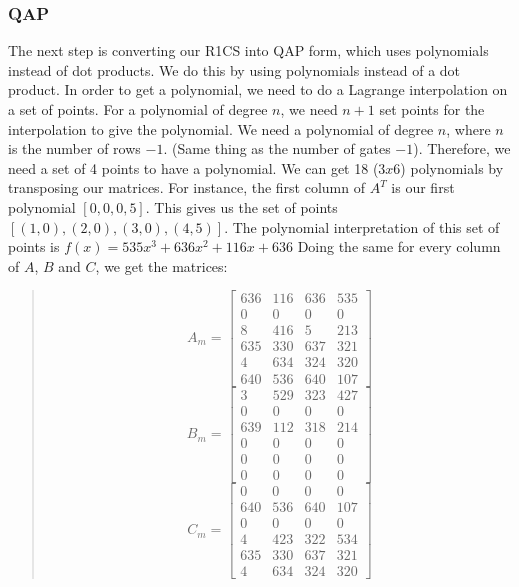 \subsubsection{QAP}
The next step is converting our R1CS into QAP form, which uses polynomials instead of dot products.
We do this by using polynomials instead of a dot product.
In order to get a polynomial, we need to do a Lagrange interpolation on a set of points.
For a polynomial of degree $n$, we need $n+1$ set points for the interpolation to give the polynomial.
We need a polynomial of degree $n$, where $n$ is the number of rows $- 1$. (Same thing as the number of gates $-1$). 
Therefore, we need a set of 4 points to have a polynomial.
We can get 18 ($3x6$) polynomials by transposing our matrices.
For instance, the first column of $A^T$ is our first polynomial $[0,0,0,5]$.
This gives us the set of points $[(1,0),(2,0),(3,0),(4,5)]$.
The polynomial interpretation of this set of points is $f(x) = 535x^3+636x^2+116x+636$
Doing the same for every column of $A$, $B$ and $C$, we get the matrices:
\begin{quote}
   \[
 A_m =
   \begin{bmatrix}
      636 & 116 & 636 & 535 \\
      0   & 0   & 0   & 0   \\
      8   & 416 & 5   & 213 \\
      635 & 330 & 637 & 321 \\
      4   & 634 & 324 & 320 \\
      640 & 536 & 640 & 107
   \end{bmatrix}
   \]
   \[
 B_m =
   \begin{bmatrix}
      3   & 529 & 323 & 427 \\
      0   & 0   & 0   & 0   \\
      639 & 112 & 318 & 214 \\
      0   & 0   & 0   & 0   \\
      0   & 0   & 0   & 0   \\
      0   & 0   & 0   & 0
   \end{bmatrix}
   \]
   \[
 C_m =
   \begin{bmatrix}
      0   & 0   & 0   & 0   \\
      640 & 536 & 640 & 107 \\
      0   & 0   & 0   & 0   \\
      4   & 423 & 322 & 534 \\
      635 & 330 & 637 & 321 \\
      4   & 634 & 324 & 320
   \end{bmatrix}
   \]
   \end{quote}
   
